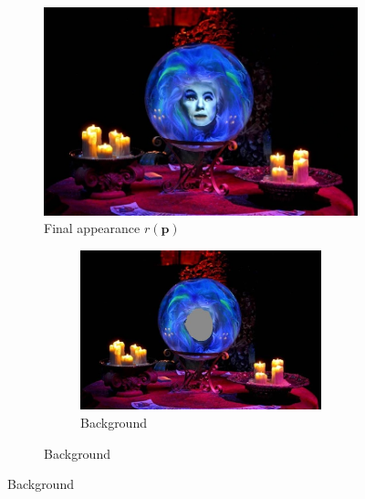 \begin{figure}
    \centering
    \begin{subfigure}{0.5\textwidth}
        \centering
        \includegraphics[width=\textwidth]{images/01-Leota.jpg}
        \caption*{Final appearance \(r(\bm{p})\)}
    \end{subfigure}
    \hfill
    \begin{subfigure}{0.3\textwidth}
        \centering
        \begin{subfigure}{\textwidth}
            \centering
            \includegraphics[width=\textwidth]{images/01-Leota-no_head.jpg}
            \caption*{Background}
        \end{subfigure}
        

\end{subfigure}
\end{figure}
